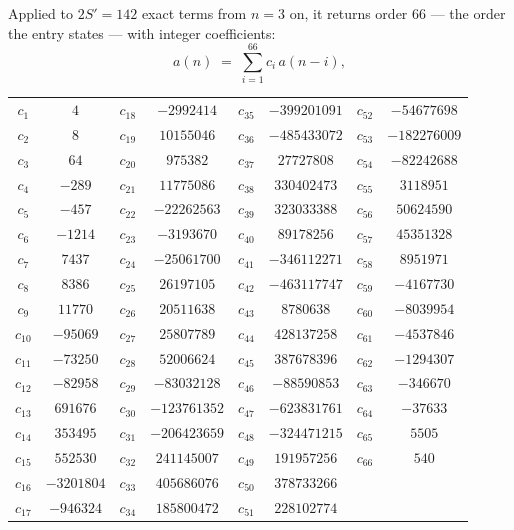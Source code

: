 \documentclass[11pt,a4paper]{article}
\theoremstyle{plain}
\theoremstyle{definition}
\begin{document}
Applied to $2S'=142$ exact terms from $n=3$ on, it returns order $66$ --- the
order the entry states --- with integer coefficients:
\[
a(n)\;=\;\sum_{i=1}^{66}c_i\,a(n-i),
\]
\begin{center}\small
\begin{tabular}{cccccccc}
$c_{1}$ & $4$ & $c_{18}$ & $-2992414$ & $c_{35}$ & $-399201091$ & $c_{52}$ & $-54677698$ \\
$c_{2}$ & $8$ & $c_{19}$ & $10155046$ & $c_{36}$ & $-485433072$ & $c_{53}$ & $-182276009$ \\
$c_{3}$ & $64$ & $c_{20}$ & $975382$ & $c_{37}$ & $27727808$ & $c_{54}$ & $-82242688$ \\
$c_{4}$ & $-289$ & $c_{21}$ & $11775086$ & $c_{38}$ & $330402473$ & $c_{55}$ & $3118951$ \\
$c_{5}$ & $-457$ & $c_{22}$ & $-22262563$ & $c_{39}$ & $323033388$ & $c_{56}$ & $50624590$ \\
$c_{6}$ & $-1214$ & $c_{23}$ & $-3193670$ & $c_{40}$ & $89178256$ & $c_{57}$ & $45351328$ \\
$c_{7}$ & $7437$ & $c_{24}$ & $-25061700$ & $c_{41}$ & $-346112271$ & $c_{58}$ & $8951971$ \\
$c_{8}$ & $8386$ & $c_{25}$ & $26197105$ & $c_{42}$ & $-463117747$ & $c_{59}$ & $-4167730$ \\
$c_{9}$ & $11770$ & $c_{26}$ & $20511638$ & $c_{43}$ & $8780638$ & $c_{60}$ & $-8039954$ \\
$c_{10}$ & $-95069$ & $c_{27}$ & $25807789$ & $c_{44}$ & $428137258$ & $c_{61}$ & $-4537846$ \\
$c_{11}$ & $-73250$ & $c_{28}$ & $52006624$ & $c_{45}$ & $387678396$ & $c_{62}$ & $-1294307$ \\
$c_{12}$ & $-82958$ & $c_{29}$ & $-83032128$ & $c_{46}$ & $-88590853$ & $c_{63}$ & $-346670$ \\
$c_{13}$ & $691676$ & $c_{30}$ & $-123761352$ & $c_{47}$ & $-623831761$ & $c_{64}$ & $-37633$ \\
$c_{14}$ & $353495$ & $c_{31}$ & $-206423659$ & $c_{48}$ & $-324471215$ & $c_{65}$ & $5505$ \\
$c_{15}$ & $552530$ & $c_{32}$ & $241145007$ & $c_{49}$ & $191957256$ & $c_{66}$ & $540$ \\
$c_{16}$ & $-3201804$ & $c_{33}$ & $405686076$ & $c_{50}$ & $378733266$ &  &  \\
$c_{17}$ & $-946324$ & $c_{34}$ & $185800472$ & $c_{51}$ & $228102774$ &  &  \\
\end{tabular}
\end{center}
\end{document}
